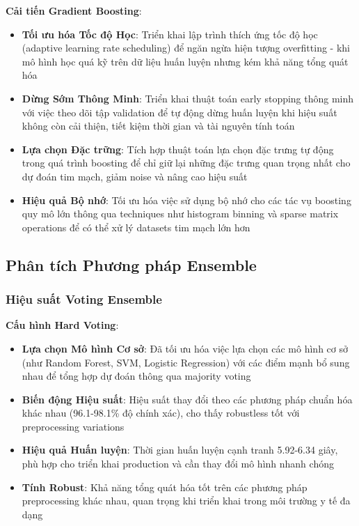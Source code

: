 \textbf{Cải tiến Gradient Boosting}:
\begin{itemize}
    \item \textbf{Tối ưu hóa Tốc độ Học}: Triển khai lập trình thích ứng tốc độ học (adaptive learning rate scheduling) để ngăn ngừa hiện tượng overfitting - khi mô hình học quá kỹ trên dữ liệu huấn luyện nhưng kém khả năng tổng quát hóa
    \item \textbf{Dừng Sớm Thông Minh}: Triển khai thuật toán early stopping thông minh với việc theo dõi tập validation để tự động dừng huấn luyện khi hiệu suất không còn cải thiện, tiết kiệm thời gian và tài nguyên tính toán
    \item \textbf{Lựa chọn Đặc trững}: Tích hợp thuật toán lựa chọn đặc trưng tự động trong quá trình boosting để chỉ giữ lại những đặc trưng quan trọng nhất cho dự đoán tim mạch, giảm noise và nâng cao hiệu suất
    \item \textbf{Hiệu quả Bộ nhớ}: Tối ưu hóa việc sử dụng bộ nhớ cho các tác vụ boosting quy mô lớn thông qua techniques như histogram binning và sparse matrix operations để có thể xử lý datasets tim mạch lớn hơn
\end{itemize}

\subsection{Phân tích Phương pháp Ensemble}\label{subsec:ensemble-methods}  

\subsubsection{Hiệu suất Voting Ensemble}

\textbf{Cấu hình Hard Voting}:
\begin{itemize}
    \item \textbf{Lựa chọn Mô hình Cơ sở}: Đã tối ưu hóa việc lựa chọn các mô hình cơ sở (như Random Forest, SVM, Logistic Regression) với các điểm mạnh bổ sung nhau để tổng hợp dự đoán thông qua majority voting
    \item \textbf{Biến động Hiệu suất}: Hiệu suất thay đổi theo các phương pháp chuẩn hóa khác nhau (96.1-98.1\% độ chính xác), cho thấy robustless tốt với preprocessing variations
    \item \textbf{Hiệu quả Huấn luyện}: Thời gian huấn luyện cạnh tranh 5.92-6.34 giây, phù hợp cho triển khai production và cần thay đổi mô hình nhanh chóng
    \item \textbf{Tính Robust}: Khả năng tổng quát hóa tốt trên các phương pháp preprocessing khác nhau, quan trọng khi triển khai trong môi trường y tế đa dạng
\end{itemize}

